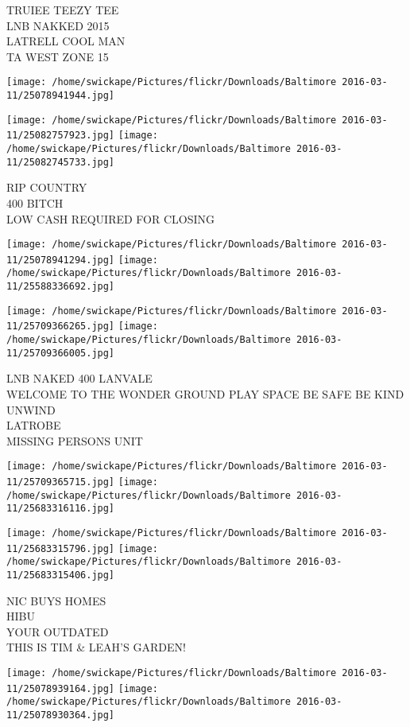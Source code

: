 \documentclass[10pt,letterpaper]{article}
\begin{document}
TRUIEE TEEZY TEE\\
LNB NAKKED 2015\\
LATRELL COOL MAN\\
TA WEST ZONE 15
\pagebreak

\texttt{[image: /home/swickape/Pictures/flickr/Downloads/Baltimore 2016-03-11/25078941944.jpg]}

\vspace{0.25in}
\texttt{[image: /home/swickape/Pictures/flickr/Downloads/Baltimore 2016-03-11/25082757923.jpg]}
\texttt{[image: /home/swickape/Pictures/flickr/Downloads/Baltimore 2016-03-11/25082745733.jpg]}

RIP COUNTRY\\
400 BITCH\\
LOW CASH REQUIRED FOR CLOSING
\pagebreak

\texttt{[image: /home/swickape/Pictures/flickr/Downloads/Baltimore 2016-03-11/25078941294.jpg]}
\texttt{[image: /home/swickape/Pictures/flickr/Downloads/Baltimore 2016-03-11/25588336692.jpg]}

\texttt{[image: /home/swickape/Pictures/flickr/Downloads/Baltimore 2016-03-11/25709366265.jpg]}
\texttt{[image: /home/swickape/Pictures/flickr/Downloads/Baltimore 2016-03-11/25709366005.jpg]}

LNB NAKED 400 LANVALE\\
WELCOME TO THE WONDER GROUND PLAY SPACE BE SAFE BE KIND UNWIND\\
LATROBE\\
MISSING PERSONS UNIT
\pagebreak

\texttt{[image: /home/swickape/Pictures/flickr/Downloads/Baltimore 2016-03-11/25709365715.jpg]}
\texttt{[image: /home/swickape/Pictures/flickr/Downloads/Baltimore 2016-03-11/25683316116.jpg]}

\texttt{[image: /home/swickape/Pictures/flickr/Downloads/Baltimore 2016-03-11/25683315796.jpg]}
\texttt{[image: /home/swickape/Pictures/flickr/Downloads/Baltimore 2016-03-11/25683315406.jpg]}

NIC BUYS HOMES\\
HIBU\\
YOUR OUTDATED\\
THIS IS TIM \& LEAH'S GARDEN!
\pagebreak

\texttt{[image: /home/swickape/Pictures/flickr/Downloads/Baltimore 2016-03-11/25078939164.jpg]}
\texttt{[image: /home/swickape/Pictures/flickr/Downloads/Baltimore 2016-03-11/25078930364.jpg]}
\end{document}
